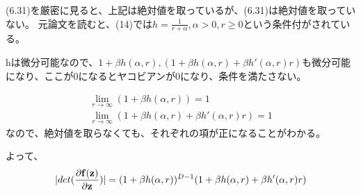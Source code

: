 ﻿\documentclass{jsarticle}
\begin{document}
(6.31)を厳密に見ると、上記は絶対値を取っているが、(6.31)は絶対値を取っていない。
元論文を読むと、(14)では$h = \frac{1}{r + \alpha}, \alpha > 0, r \geq 0$という条件付がされている。

hは微分可能なので、$1 + \beta h(\alpha, r), (1 + \beta h(\alpha, r) + \beta h'(\alpha, r)r)$も微分可能になり、ここが0になるとヤコビアンが0になり、条件を満たさない。

\begin{equation}
\begin{split}
\lim_{r \rightarrow \infty} (1 + \beta h(\alpha, r)) = 1\\
\lim_{r \rightarrow \infty} (1 + \beta h(\alpha, r) + \beta h'(\alpha, r)r) = 1
\end{split}
\end{equation}
なので、絶対値を取らなくても、それぞれの項が正になることがわかる。

よって、
\begin{equation}
\begin{split}
|det(\frac{\partial {\bf f}({\bf z})}{\partial {\bf z}})|
= (1 + \beta h(\alpha, r))^{D-1} (1 + \beta h(\alpha, r) + \beta h'(\alpha, r)r)
\end{split}
\end{equation}
\end{document}
